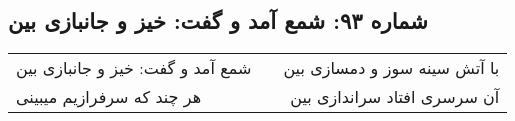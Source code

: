 \begin{center}
\section*{شماره ۹۳: شمع آمد و گفت: خیز و جانبازی بین}
\label{sec:093}
\begin{longtable}{l p{0.5cm} r}
شمع آمد و گفت: خیز و جانبازی بین
&&
با آتش سینه سوز و دمسازی بین
\\
هر چند که سرفرازیم میبینی
&&
آن سرسری افتاد سراندازی بین
\\
\end{longtable}
\end{center}

